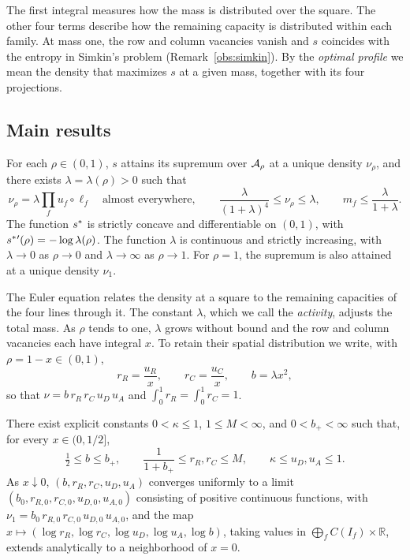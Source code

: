 The first integral measures how the mass is distributed over the square. The other four terms describe how the remaining capacity is
distributed within each family. At mass one, the row and column vacancies vanish and $s$ coincides with the entropy in Simkin's problem
(Remark~\ref{obs:simkin}). By the \emph{optimal profile} we mean the density that maximizes $s$ at a given mass, together with its four
projections.

\subsection{Main results}

\begin{teorema}\label{thm:euler} For each $\rho\in(0,1)$, $s$ attains its supremum over ${\mathcal{A}}_\rho$ at a
unique density $\nu_\rho$, and there exists $\lambda=\lambda(\rho)>0$ such that \[
 \nu_\rho=\lambda\prod_f u_f\circ\ell_f\quad\text{almost everywhere},\qquad
 \frac{\lambda}{(1+\lambda)^4}\le\nu_\rho\le\lambda,\qquad m_f\le\frac{\lambda}{1+\lambda}.
\] The function $s^{*}$ is strictly concave and differentiable on $(0,1)$, with $s^{*}{}'(\rho)=-\log\lambda(\rho)$. The function
$\lambda$ is continuous and strictly increasing, with $\lambda\to0$ as $\rho\to0$ and $\lambda\to\infty$ as $\rho\to1$. For $\rho=1$,
the supremum is also attained at a unique density $\nu_1$. \end{teorema}

The Euler equation relates the density at a square to the remaining capacities of the four lines through it. The constant $\lambda$,
which we call the \emph{activity}, adjusts the total mass. As $\rho$ tends to one, $\lambda$ grows without bound and the row and column
vacancies each have integral $x$. To retain their spatial distribution we write, with $\rho=1-x\in(0,1)$,
\begin{equation}\label{eq:reescala}
 r_R=\frac{u_R}x,\qquad r_C=\frac{u_C}x,\qquad b=\lambda x^2,
\end{equation} so that $\nu=b\,r_R\,r_C\,u_D\,u_A$ and $\int_0^1r_R=\int_0^1r_C=1$.

\begin{teorema}\label{thm:lleno} There exist explicit constants $0<\kappa\le1$, $1\le M<\infty$, and
$0<b_+<\infty$ such that, for every $x\in(0,1/2]$, \[
 \tfrac12\le b\le b_+,\qquad \frac1{1+b_+}\le r_R,r_C\le M,\qquad \kappa\le u_D,u_A\le1 .
\] As $x\downarrow0$, $(b,r_R,r_C,u_D,u_A)$ converges uniformly to a limit $(b_0,r_{R,0},r_{C,0},u_{D,0},u_{A,0})$ consisting of
positive continuous functions, with $\nu_1=b_0\,r_{R,0}\,r_{C,0}\,u_{D,0}\,u_{A,0}$, and the map $x\mapsto(\log r_R,\log r_C,\log
u_D,\log u_A,\log b)$, taking values in $\bigoplus_fC(I_f)\times\mathbb R$, extends analytically to a neighborhood of $x=0$.
\end{teorema}
